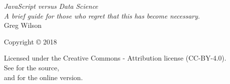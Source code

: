 \pagestyle{empty}

{\begingroup
  \raggedleft
  \vspace*{\baselineskip}

  {\Huge\itshape JavaScript versus Data Science}\\[\baselineskip]

  {\large\itshape
    A brief guide for those who regret that this has become necessary.
  }\\[0.2\textheight]

  {\large Greg Wilson}\par

  \vfill

  {\large Copyright {\copyright} 2018}

  \vspace*{\baselineskip}

  {\small
    Licensed under the Creative Commons - Attribution license (CC-BY-4.0).
    \\
    See {\repository} for the source,\\
    and {\website} for the online version.
  }

\endgroup}

\newpage

\pagestyle{empty}

~

\newpage

\tableofcontents

\newpage

\pagestyle{empty}

~

\newpage

\pagestyle{plain}
